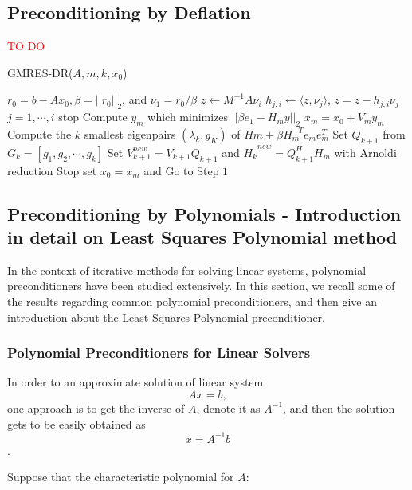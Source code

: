 \subsection{Preconditioning by Deflation}

\textcolor{red}{TO DO}

\begin{algorithm}[htbp]
	\caption{GMRES-DR($A, m,k,x_0$)}
	\label{alg:gmres-dr}
	\begin{algorithmic}[1]
		\State $r_0=b-A x_0, \beta=||r_0||_2$, and $\nu_1=r_0/\beta$
		\State $z \leftarrow M^{-1}A\nu_i$
		\State $h_{j,i} \leftarrow \langle z,\nu_j\rangle$, $z = z- h_{j,i}\nu_j$ $j=1,\cdots,i$
		\State stop
		\Else
		\EndIf
		\EndFor
		\State Compute $y_m$ which minimizes $||\beta e_1-H_m y||_2$ 
		\State $x_m=x_0+V_my_m$
		\State Compute the $k$ smallest eigenpairs $(\lambda_k, g_K)$ of $Hm+\beta H_m^{-T}e_me_m^T$
		\State Set $Q_{k+1}$ from $G_k=[g_1,g_2,\cdots,g_k]$
		\State Set $V_{k+1}^{new} = V_{k+1}Q_{k+1}$ and $\bar{H_{k}}^{new} = Q_{k+1}^H \bar{H_m}$ with Arnoldi reduction
		\State Stop
		\EndIf
		\State set $x_0 = x_m$ and Go to Step $1$
	\end{algorithmic}
\end{algorithm}

\subsection{Preconditioning by Polynomials - Introduction in detail on Least Squares Polynomial method}

In the context of iterative methods for solving linear systems, polynomial preconditioners have been studied extensively. In this section, we recall some of the results regarding common polynomial preconditioners, and then give an introduction about the Least Squares Polynomial preconditioner.

\subsubsection{Polynomial Preconditioners for Linear Solvers}

In order to an approximate solution of linear system \[Ax=b,\]one approach is to get the inverse of $A$, denote it as $A^{-1}$, and then the solution gets to be easily obtained as \[x=A^{-1}b\].

Suppose that the characteristic polynomial for $A$:

